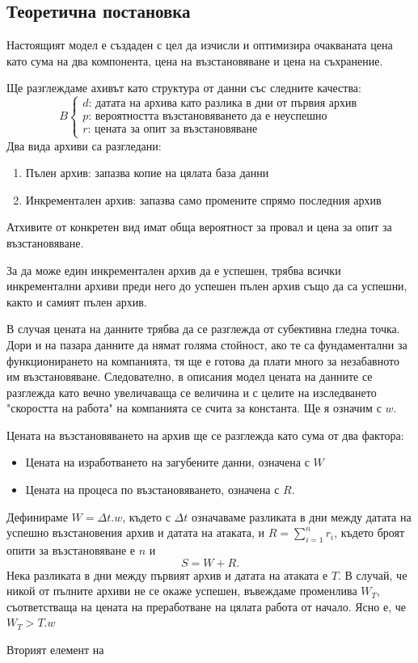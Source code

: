 \documentclass[11pt, a4paper]{article}
\theoremstyle{definition}
\begin{document}
		\subsection{Теоретична постановка}
			Настоящият модел е създаден с цел да изчисли и оптимизира очакваната цена като сума на два компонента, цена на възстановяване и цена на съхранение.\par
			Ще разглеждаме ахивът като структура от данни със следните качества:
			$$
			B
			\begin{cases}
			d \text{: датата на архива като разлика в дни от първия архив}\\
			p \text{: вероятността възстановяването да е неуспешно}\\
			r \text{: цената за опит за възстановяване}
			\end{cases}
			$$
			Два вида архиви са разгледани:
			\begin{enumerate}
				\item Пълен архив: запазва копие на цялата база данни
				\item Инкрементален архив: запазва само промените спрямо последния архив
			\end{enumerate}
			Атхивите от конкретен вид имат обща вероятност за провал и цена за опит за възстановяване. \par
			За да може един инкрементален архив да е успешен, трябва всички инкрементални архиви преди него до успешен пълен архив също да са успешни, както и самият пълен архив.\par
			В случая цената на данните трябва да се разглежда от субективна гледна точка. Дори и на пазара данните да нямат голяма стойност, ако те са фундаментални за функционирането на компанията, тя ще е готова да плати много за незабавното им възстановяване. Следователно, в описания модел цената на данните се разглежда като вечно увеличаваща се величина и с целите на изследването "скоростта на работа" на компанията се счита за константа. Ще я означим с $w$.\par
			Цената на възстановяването на архив ще се разглежда като сума от два фактора:
			\begin{itemize}
				\item Цената на изработването на загубените данни, означена с $W$
				\item Цената на процеса по възстановяването, означена с $R$.
			\end{itemize}
			Дефинираме $W = \Delta t.w$, където с $\Delta t$ означаваме разликата в дни между датата на успешно възстановения архив и датата на атаката, и $R = \sum_{i=1}^{n} r_i$, където броят опити за възстановяване е $n$ и 
			$$
			S=W + R.
			$$
			Нека разликата в дни между първият архив и датата на атаката е $T$. В случай, че никой от пълните архиви не се окаже успешен, въвеждаме променлива $W_T$, съответстваща на цената на преработване на цялата работа от начало. Ясно е, че $W_T>T.w$\par
			Вторият елемент на 
\end{document}
